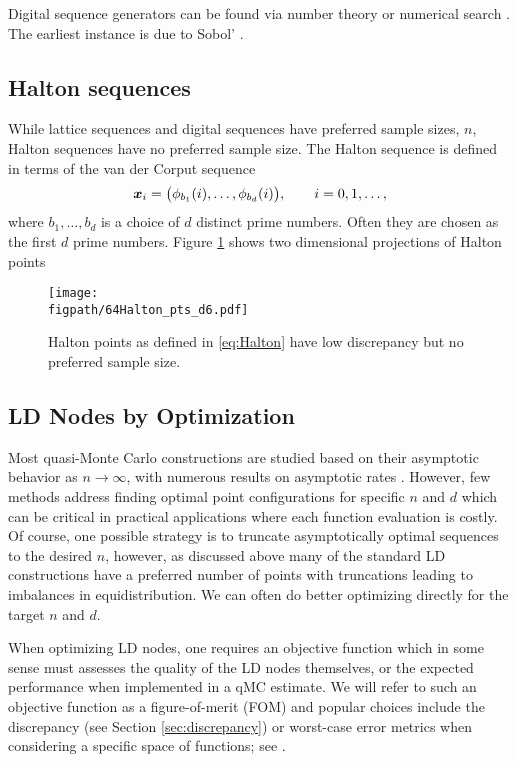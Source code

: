 \documentclass{svproc}
\newcommand{\figpath}{Figures}
\begin{document}
Digital sequence generators can be found via number theory or numerical search \cite{}.  The earliest instance is due to Sobol' \cite{}.

\subsection{Halton sequences} \label{sec:Halton}  While lattice sequences and digital sequences have preferred sample sizes, $n$, Halton sequences have no preferred sample size.  The Halton sequence is defined in terms of the van der Corput sequence
\begin{equation}\label{eq:Halton}
	{\boldsymbol{x}}_i = \bigl( \phi_{b_1}(i), \ldots, \phi_{b_d}(i) \bigr), \qquad i = 0, 1, \ldots,
\end{equation}
where $b_1, \ldots, b_d$ is a choice of $d$ distinct prime numbers.  Often they are chosen as the first $d$ prime numbers.  Figure \ref{fig:Halton} shows two dimensional projections of Halton points

\begin{figure}
	\centering
	\texttt{[image: \\figpath/64Halton\_pts\_d6.pdf]}
	\caption{Halton points as defined in \eqref{eq:Halton} have low discrepancy but no preferred sample size. \label{fig:Halton}}
\end{figure}

\subsection{LD Nodes by Optimization}\label{sec:optLD}

Most quasi-Monte Carlo constructions are studied based on their asymptotic behavior as \(n \to \infty\), with numerous results on asymptotic rates \cite{NIED1978QMCBook,NovWoz10a}. However, few methods address finding optimal point configurations for specific \(n\) and \(d\) which can be critical in practical applications where each function evaluation is costly. Of course, one possible strategy is to truncate asymptotically optimal sequences to the desired \(n\), however, as discussed above many of the standard LD constructions have a preferred number of points with truncations leading to imbalances in equidistribution. We can often do better optimizing directly for the target \(n\) and \(d\).

When optimizing LD nodes, one requires an objective function which in some sense must assesses the quality of the LD nodes themselves, or the expected performance when implemented in a qMC estimate.  We will refer to such an objective function as a figure-of-merit (FOM) and popular choices include the discrepancy (see Section \ref{sec:discrepancy}) or worst-case error metrics when considering a specific space of functions; see \cite{Hic00a,LatNet}.
\end{document}
